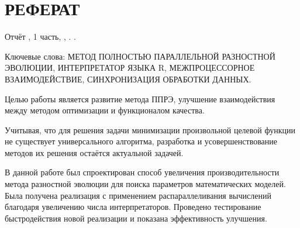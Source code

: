 \chapter*{РЕФЕРАТ}


Отчёт ,
1 часть,
,
.
.
\bigskip

Ключевые слова:
МЕТОД ПОЛНОСТЬЮ ПАРАЛЛЕЛЬНОЙ РАЗНОСТНОЙ ЭВОЛЮЦИИ,
ИНТЕРПРЕТАТОР ЯЗЫКА R,
МЕЖПРОЦЕССОРНОЕ ВЗАИМОДЕЙСТВИЕ,
СИНХРОНИЗАЦИЯ ОБРАБОТКИ ДАННЫХ.

Целью работы является развитие
метода ППРЭ,
улучшение взаимодействия между методом оптимизации
и функционалом качества.

Учитывая, что для решения задачи
минимизации произвольной целевой функции
не существует универсального алгоритма,
разработка и усовершенствование
методов их решения остаётся актуальной задачей.

В данной работе был спроектирован
способ увеличения производительности
метода разностной эволюции
для поиска параметров математических моделей.
Была получена реализация
с применением распараллеливания вычислений
благодаря увеличению числа интерпретаторов.
Проведено тестирование быстродействия
новой реализации и показана эффективность улучшения.

